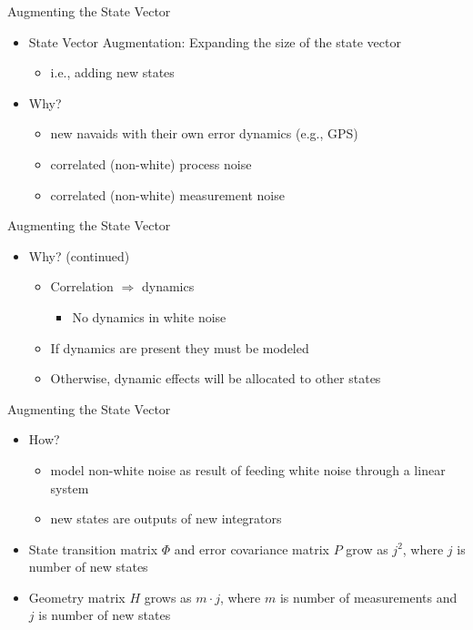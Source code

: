 \begin{frame}
Augmenting the State Vector
 \begin{itemize}
 \item State Vector Augmentation: Expanding the size of the state vector
\begin{itemize}
	\item i.e., adding new states
\end{itemize}
 \item Why?
\begin{itemize}
	\item new navaids with their own error dynamics (e.g., GPS)
	\item correlated (non-white) process noise
	\item correlated (non-white) measurement noise
\end{itemize}
\end{itemize}
\end{frame}
\begin{frame}
Augmenting the State Vector
\begin{itemize}
  \item Why? (continued)
\begin{itemize}
  \item Correlation $\Rightarrow$ dynamics
\begin{itemize}
	\item No dynamics in white noise
\end{itemize}
  \item If dynamics are present they must be modeled
  \item Otherwise, dynamic effects will be allocated to other states
\end{itemize} 
\end{itemize} 
\end{frame}
\begin{frame}
Augmenting the State Vector
\begin{itemize}
 \item How?
\begin{itemize}
	\item model non-white noise as result of feeding white noise through a linear system
	\item new states are outputs of new integrators
\end{itemize}
  \item State transition matrix $\Phi$ and error covariance matrix $P$ grow as $j^2$, where $j$ is number of new states
  \item Geometry matrix $H$ grows as $m\cdot j$, where $m$ is number of measurements and $j$ is number of new states
\end{itemize} 
\end{frame}

